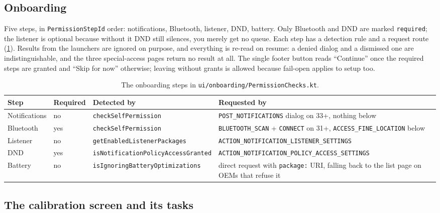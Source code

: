 \documentclass[10pt,a4paper]{article}
\newcommand{\file}[1]{\texttt{\small #1}}          %
\newcommand{\code}[1]{\texttt{#1}}                  %
\begin{document}
\subsection{Onboarding}

Five steps, in \code{PermissionStepId} order: notifications, Bluetooth, listener, DND, battery.
Only Bluetooth and DND are marked \code{required}; the listener is optional because without it
DND still silences, you merely get no queue. Each step has a detection rule and a request route
(\cref{tab:onboarding}). Results from the launchers are ignored on purpose, and everything is
re-read on resume: a denied dialog and a dismissed one are indistinguishable, and the three
special-access pages return no result at all. The single footer button reads ``Continue'' once
the required steps are granted and ``Skip for now'' otherwise; leaving without grants is allowed
because fail-open applies to setup too.

\begin{table}[htbp]\centering\footnotesize
\begin{tabularx}{\textwidth}{@{}l l X X@{}}
\toprule
\textbf{Step} & \textbf{Required} & \textbf{Detected by} & \textbf{Requested by} \\
\midrule
Notifications & no & \code{checkSelfPermission} & \code{POST\_NOTIFICATIONS} dialog on 33+, nothing below \\
Bluetooth & yes & \code{checkSelfPermission} & \code{BLUETOOTH\_SCAN} + \code{CONNECT} on 31+, \code{ACCESS\_FINE\_LOCATION} below \\
Listener & no & \code{getEnabledListenerPackages} & \code{ACTION\_NOTIFICATION\_\allowbreak LISTENER\_SETTINGS} \\
DND & yes & \code{isNotificationPolicyAccessGranted} & \code{ACTION\_NOTIFICATION\_\allowbreak POLICY\_ACCESS\_\allowbreak SETTINGS} \\
Battery & no & \code{isIgnoringBatteryOptimizations} & direct request with \code{package:} URI, falling back to the list page on OEMs that refuse it \\
\bottomrule
\end{tabularx}
\caption{The onboarding steps in \file{ui/onboarding/PermissionChecks.kt}.}\label{tab:onboarding}
\end{table}

\subsection{The calibration screen and its tasks}\label{sec:d:calibration}
\end{document}
